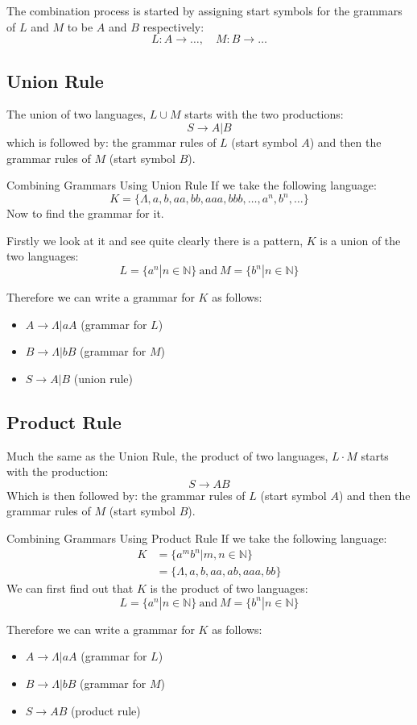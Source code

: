 The combination process is started by assigning start symbols for the grammars of $L$ and $M$ to be $A$ and $B$ respectively:
\[L:A \rightarrow \ldots, \quad M:B \rightarrow \ldots \]

\subsection{Union Rule}
The union of two languages, $L \cup M$ starts with the two productions:
\[S \rightarrow A|B\]
which is followed by: the grammar rules of $L$ (start symbol $A$) and then the grammar rules of $M$ (start symbol $B$).

\begin{example}{Combining Grammars Using Union Rule}
If we take the following language:
\[K =\{\Lambda, a, b, aa, bb, aaa, bbb, \ldots, a^n, b^n, \ldots\}\]
Now to find the grammar for it. 

Firstly we look at it and see quite clearly there is a pattern, $K$ is a union of the two languages:
\[L = \{a^n | n \in \mathbb{N}\} \ \mathrm{and}\ M = \{b^n | n \in \mathbb{N}\} \]

Therefore we can write a grammar for $K$ as follows:
\begin{itemize}
    \item $A \rightarrow \Lambda | aA$ (grammar for $L$)
    \item $B \rightarrow \Lambda | bB$ (grammar for $M$)
    \item $S \rightarrow A|B$ (union rule)
\end{itemize}
    
\end{example}

\subsection{Product Rule}
Much the same as the Union Rule, the product of two languages, $L \cdot M$ starts with the production:
\[S \rightarrow AB\]
Which is then followed by: the grammar rules of $L$ (start symbol $A$) and then the grammar rules of $M$ (start symbol $B$).

\begin{example}{Combining Grammars Using Product Rule}
If we take the following language:
\begin{align*}
    K &= \{a^mb^n | m, n \in \mathbb{N}\}\\
    &= \{\Lambda, a, b, aa, ab, aaa, bb\}
\end{align*}
We can first find out that $K$ is the product of two languages:
\[L = \{a^n | n \in \mathbb{N}\} \ \mathrm{and}\ M = \{b^n | n \in \mathbb{N}\} \]

Therefore we can write a grammar for $K$ as follows:
\begin{itemize}
    \item $A \rightarrow \Lambda | aA$ (grammar for $L$)
    \item $B \rightarrow \Lambda | bB$ (grammar for $M$)
    \item $S \rightarrow AB$ (product rule)
\end{itemize}
\end{example}

